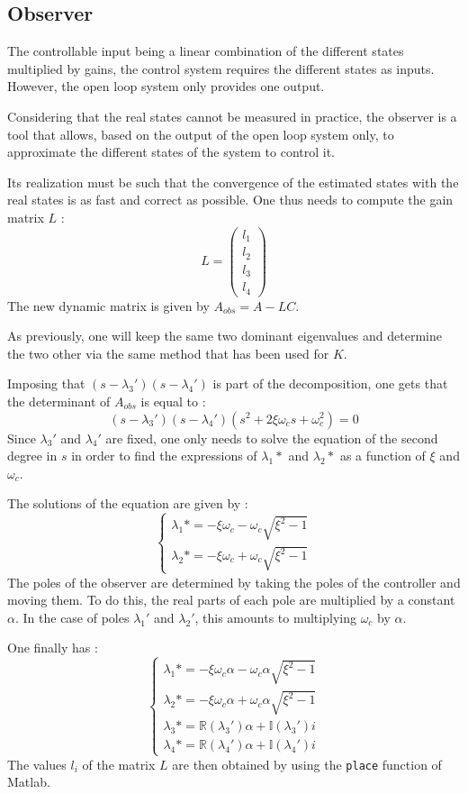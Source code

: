 \subsection{Observer}
The controllable input being a linear combination of the different states multiplied by gains, the control system requires the different states as inputs. However, the open loop system only provides one output.\par
Considering that the real states cannot be measured in practice, the observer is a tool that allows, based on the output of the open loop system only, to approximate the different states of the system to control it.\par
Its realization must be such that the convergence of the estimated states with the real states is as fast and correct as possible.
One thus needs to compute the gain matrix $L$ :
$$
L = \begin{pmatrix}
    l_1\\
    l_2\\
    l_3\\
    l_4
\end{pmatrix}
$$
The new dynamic matrix is given by $A_{obs} = A - LC$.\par
As previously, one will keep the same two dominant eigenvalues and determine the two other via the same method that has been used for $K$.\par
Imposing that $(s - \lambda_3')(s - \lambda_4')$ is part of the decomposition, one gets that the determinant of $A_{obs}$ is equal to :
$$
(s - \lambda_3')(s - \lambda_4')(s^2 + 2 \xi\omega_c s + \omega_c^2) = 0
$$
Since $\lambda_3'$ and $\lambda_4'$ are fixed, one only needs to solve the equation of the second degree in $s$ in order to find the expressions of $\lambda_1*$ and $\lambda_2*$ as a function of $\xi$ and $\omega_c$.\par
The solutions of the equation are given by :
$$
\begin{cases}
    \lambda_1* = -\xi\omega_c - \omega_c\sqrt{\xi^2 - 1}\\
    \lambda_2* = -\xi\omega_c + \omega_c\sqrt{\xi^2 - 1}
\end{cases}
$$
The poles of the observer are determined by taking the poles of the controller and moving them. To do this, the real parts of each pole are multiplied by a constant $\alpha$. In the case of poles $\lambda_1'$ and $\lambda_2'$, this amounts to multiplying $\omega_c$ by $\alpha$.\par
One finally has :
$$
\begin{cases}
    \lambda_1* = -\xi\omega_c\alpha - \omega_c\alpha\sqrt{\xi^2 - 1}\\
    \lambda_2* = -\xi\omega_c\alpha + \omega_c\alpha\sqrt{\xi^2 - 1}\\
    \lambda_3* = \mathbb{R}(\lambda_3')\alpha + \mathbb{I}(\lambda_3')i\\
    \lambda_4* = \mathbb{R}(\lambda_4')\alpha + \mathbb{I}(\lambda_4')i
\end{cases}
$$
The values $l_i$ of the matrix $L$ are then obtained by using the \texttt{place} function of Matlab.

